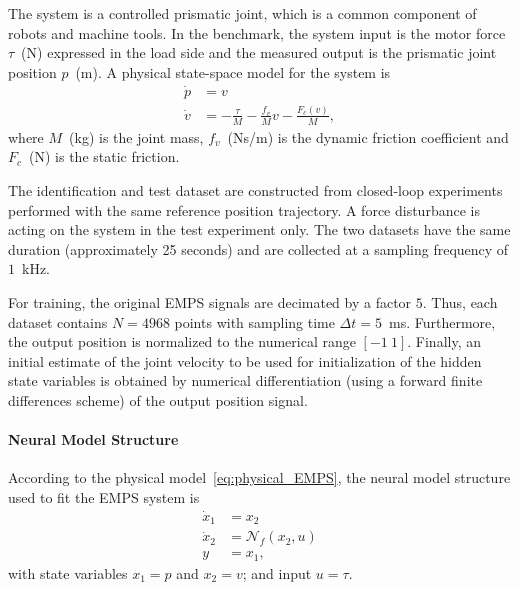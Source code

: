 \documentclass{article} %
\newcommand{\NN}{\mathcal{N}} %
\newcommand{\nsamp}{N}
\begin{document}
The system is a controlled prismatic joint, which is a common component of robots and machine tools. 
In the benchmark, the system input is the motor force $\tau$~(N) expressed in the load side and the measured output is the prismatic joint position $p$~(m).
A physical state-space model for the system is
\begin{subequations}
\label{eq:physical_EMPS}
\begin{align}
 \dot p &= v \label{eq:physical_EMPS_pos}\\
 \dot v &= -\frac{\tau}{M} - \frac{f_v}{M} v  - \frac{F_c(v)}{M}, \label{eq:physical_EMPS_velo}
\end{align}
\end{subequations}
where $M$~(kg) is the joint mass, $f_v$~(Ns/m) is the dynamic friction coefficient and $F_c$~(N) is the static friction.

The identification and test dataset are constructed from closed-loop experiments performed with the same reference position trajectory. A force disturbance is acting on the system in the test experiment only.
The two datasets have the same duration (approximately 25 seconds) and are collected at a sampling frequency of $1$~kHz.  

{For training, the original EMPS signals  are decimated by a factor $5$. Thus, each dataset contains $\nsamp=4968$ points with sampling time $\Delta t=5$~ms.} {Furthermore, the output position is normalized to the numerical range $[-1\ 1]$. Finally, an initial estimate of the joint velocity to be used for initialization of the hidden state variables is obtained by numerical differentiation (using a forward finite differences scheme) of the output position signal.}

\paragraph{Neural Model Structure}
According to the physical model~\eqref{eq:physical_EMPS}, the neural model structure used to fit the EMPS system is
\begin{subequations}
\label{eq:neural_EMPS}
\begin{align}
 \dot x_1 &= x_2 \\
 \dot x_2 &= \NN_{\!f}(x_2, u) \\
      y   &= x_1,
\end{align}
\end{subequations}
  with state variables   $x_1 = p$ and $x_2=v$; and  input $u=\tau$.  
  
\end{document}
